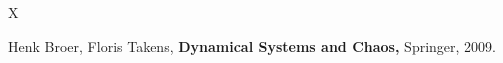 \documentclass[12pt]{article}
\begin{document}
\begin{thebibliography}{X}

 Henk Broer, Floris Takens, {\bf Dynamical Systems
and Chaos,} Springer, 2009.


\end{thebibliography}
\end{document}
